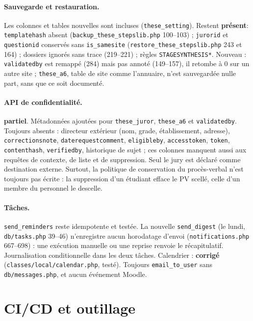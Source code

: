 \documentclass[11pt,a4paper]{article}
\newcommand{\fichier}[1]{\texttt{\small #1}}
\newcommand{\code}[1]{\texttt{#1}}
\newcommand{\corrige}{\textcolor{green!45!black}{\textbf{corrigé}}}
\newcommand{\partiel}{\textcolor{orange!80!black}{\textbf{partiel}}}
\newcommand{\present}{\textcolor{red!70!black}{\textbf{présent}}}
\begin{document}
\paragraph{Sauvegarde et restauration.}
Les colonnes et tables nouvelles sont incluses (\code{these\_setting}). Restent \present :
\code{templatehash} absent (\fichier{backup\_these\_stepslib.php} 100--103) ; \code{jurorid} et
\code{questionid} conservés sans \code{is\_samesite} (\fichier{restore\_these\_stepslib.php} 243
et 164) ; dossiers ignorés sans trace (219--221) ; règles \code{STAGESYNTHESIS*}. Nouveau :
\code{validatedby} est remappé (284) mais pas annoté (149--157), il retombe à 0 sur un autre
site ; \code{these\_a6}, table de site comme l'annuaire, n'est sauvegardée nulle part, sans que ce
soit documenté.

\paragraph{API de confidentialité.} \partiel.
Métadonnées ajoutées pour \code{these\_juror}, \code{these\_a6} et \code{validatedby}. Toujours
absents : directeur extérieur (nom, grade, établissement, adresse), \code{correctionsnote},
\code{daterequestcomment}, \code{eligibleby}, \code{accesstoken}, \code{token},
\code{contenthash}, \code{verifiedby}, historique de sujet ; ces colonnes manquent aussi aux
requêtes de contexte, de liste et de suppression. Seul le jury est déclaré comme destination
externe. Surtout, la politique de conservation du procès-verbal n'est toujours pas écrite : la
suppression d'un étudiant efface le PV scellé, celle d'un membre du personnel le descelle.

\paragraph{Tâches.}
\code{send\_reminders} reste idempotente et testée. La nouvelle \code{send\_digest} (le lundi,
\fichier{db/tasks.php} 39--46) n'enregistre aucun horodatage d'envoi
(\fichier{notifications.php} 667--698) : une exécution manuelle ou une reprise renvoie le
récapitulatif. Journalisation conditionnelle dans les deux tâches. Calendrier : \corrige{}
(\fichier{classes/local/calendar.php}, testé). Toujours \code{email\_to\_user} sans
\fichier{db/messages.php}, et aucun événement Moodle.

\section{CI/CD et outillage}
\end{document}
